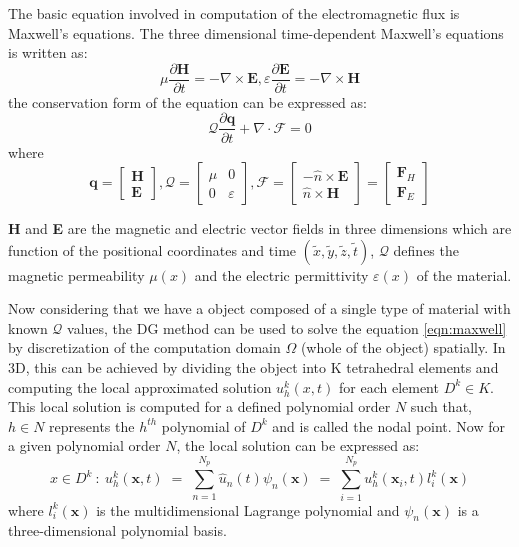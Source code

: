 The basic equation involved in computation of the electromagnetic flux is Maxwell's equations. The 
three dimensional time-dependent Maxwell's equations \cite{hesthaven_nodal_2008} is written as:
\begin{equation}\label{eqn:maxwellbase}
    \mu \frac{\partial{\textbf{H}}}{\partial{t}} = - \nabla \times \textbf{E},\varepsilon \frac{\partial{\textbf{E}}}{ \partial{t}} = - \nabla  \times \textbf{H}
\end{equation}
the conservation form of the equation can be expressed as:
\begin{equation}\label{eqn:maxwell}
    \mathcal{Q}\frac{\partial\textbf{q}}{\partial{t}}  + \nabla  \cdot \mathcal{F} = 0
\end{equation}
where
\begin{equation}\label{eqn:maxwellexpansion}
\textbf{q} =  \begin{bmatrix}\textbf{H} \\ \textbf{E} \end{bmatrix},
\mathcal{Q} =  \begin{bmatrix} \mu & 0 \\ 0 &  \varepsilon \end{bmatrix}, 
\mathcal{F} = \begin{bmatrix}  - \widehat{n} \times \textbf{E} \\ \widehat{n} \times \textbf{H} \end{bmatrix} = \begin{bmatrix} \textbf{F}_H \\ \textbf{F}_E \end{bmatrix}
\end{equation}

\textbf{H} and \textbf{E} are the magnetic and electric vector fields in
three dimensions which are function of the positional coordinates and time
$ (\tilde{x},\tilde{y}, \tilde{z}, \tilde{t}) $, $ \mathcal{Q} $ defines the magnetic permeability
$ \mu(x) $ and the electric permittivity $ \varepsilon(x) $ of the material.

Now considering that we have a object composed of a single type of material with known $ \mathcal{Q} $
values, the DG method can be used to solve the equation \ref{eqn:maxwell} by discretization of the
computation domain $ \Omega $ (whole of the object) spatially. In 3D, this can be achieved by dividing the object
into K tetrahedral elements and computing the local approximated solution $ u_h^k(x,t) $ for
each element $ D^k \in K $. This local solution is computed for a defined polynomial order $ N $ such that,
$ h \in N $ represents the $ h^{th} $ polynomial of $ D^k $ and is called the nodal point.
Now for a given polynomial order $ N $, the local solution can be expressed \cite{hesthaven_nodal_2008} as:
\begin{equation}\label{eqn:nodal_form}
    x \in D^k \ : \ u^k_{h}(\textbf{x}, t) \; = \; \sum_{n=1}^{N_p} \hat{u}_n(t) \psi_{n}(\textbf{x}) \; = \; \sum_{i=1}^{N_p} u^k_{h}(\textbf{x}_{i}, t) l^k_{i}(\textbf{x})
\end{equation}
where $ l^k_{i}(\textbf{x}) $ is the multidimensional Lagrange polynomial and $ \psi_{n}(\textbf{x}) $
is a three-dimensional polynomial basis.

